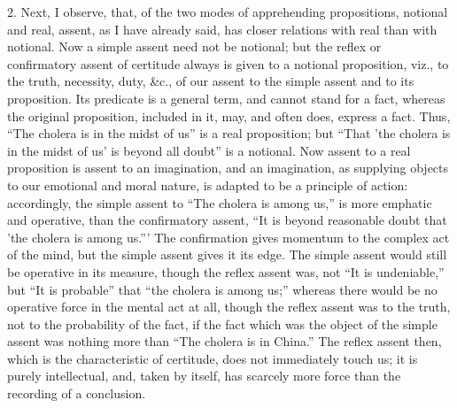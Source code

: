 2. Next, I observe, that, of the two modes of apprehending
propositions, notional and real, assent, as I have already said, has
closer relations with real than with notional. Now a simple assent
need not be notional; but the reflex or confirmatory assent of
certitude always is given to a notional proposition, viz., to the
truth, necessity, duty, \&c., of our assent to the simple assent
and to its proposition. Its predicate is a general term, and cannot
stand for a fact, whereas the original proposition, included in it,
may, and often does, express a fact. Thus, ``The cholera is in the
midst of us'' is a real proposition; but ``That 'the cholera
is in the midst of us' is beyond all doubt'' is a notional. Now
assent to a real proposition is assent to an imagination, and an
imagination, as supplying objects to our emotional and moral nature,
is adapted to be a principle of action: accordingly, the simple assent
to ``The cholera is among us,'' is more emphatic and
operative, than the confirmatory assent, ``It is beyond reasonable
doubt that 'the cholera is among us.''' The confirmation gives
momentum to the complex act of the mind, but the simple assent gives
it its edge. The simple assent would still be operative in its
measure, though the reflex assent was, not ``It is
undeniable,'' but ``It is probable'' that ``the
cholera is among us;'' whereas there would be no operative force
in the mental act at all, though the reflex assent was to the truth,
not to the probability of the fact, if the fact which was the object
of the simple assent was nothing more than ``The cholera is in
China.'' The reflex assent then, which is the characteristic of
certitude, does not immediately touch us; it is purely intellectual,
and, taken by itself, has scarcely more force than the recording of a
conclusion.

